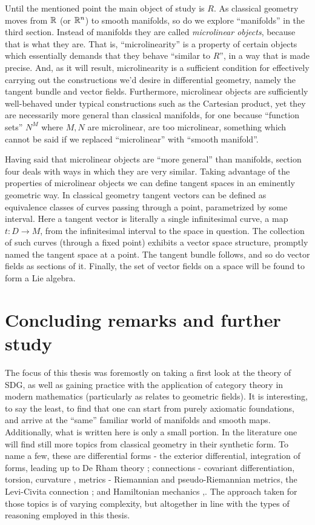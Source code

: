 Until the mentioned point the main object of study is \( R \). As classical geometry moves from \( \mathbb{R} \) (or \( \mathbb{R}^n \)) to smooth manifolds, so do we explore ``manifolds'' in the third section. Instead of manifolds they are called \emph{microlinear objects}, because that is what they are. That is, ``microlinearity'' is a property of certain objects which essentially demands that they behave ``similar to \( R \)'', in a way that is made precise. And, as it will result, microlinearity is a sufficient condition for effectively carrying out the constructions we'd desire in differential geometry, namely the tangent bundle and vector fields. Furthermore, microlinear objects are sufficiently well-behaved under typical constructions such as the Cartesian product, yet they are necessarily more general than classical manifolds, for one because ``function sets'' \( N^M \) where \( M,N \) are microlinear, are too microlinear, something which cannot be said if we replaced ``microlinear'' with ``smooth manifold''.

Having said that microlinear objects are ``more general'' than manifolds, section four deals with ways in which they are very similar. Taking advantage of the properties of microlinear objects we can define tangent spaces in an eminently geometric way. In classical geometry tangent vectors can be defined as equivalence classes of curves passing through a point, parametrized by some interval. Here a tangent vector is literally a single infinitesimal curve, a map \( t:D\to M \), from the infinitesimal interval to the space in question. The collection of such curves (through a fixed point) exhibits a vector space structure, promptly named the tangent space at a point. The tangent bundle follows, and so do vector fields as sections of it. Finally, the set of vector fields on a space will be found to form a Lie algebra.

\section{Concluding remarks and further study}

The focus of this thesis was foremostly on taking a first look at the theory of SDG, as well as gaining practice with the application of category theory in modern mathematics (particularly as relates to geometric fields). It is interesting, to say the least, to find that one can start from purely axiomatic foundations, and arrive at the ``same'' familiar world of manifolds and smooth maps. Additionally, what is written here is only a small portion. In the literature one will find still more topics from classical geometry in their synthetic form. To name a few, these are differential forms - the exterior differential, integration of forms, leading up to De Rham theory \cite{lav96}; connections - covariant differentiation, torsion, curvature \cite{lav96}, metrics - Riemannian and pseudo-Riemannian metrics, the Levi-Civita connection \cite{kock10}; and Hamiltonian mechanics \cite{lav96},\cite{nish96}. The approach taken for those topics is of varying complexity, but altogether in line with the types of reasoning employed in this thesis.

